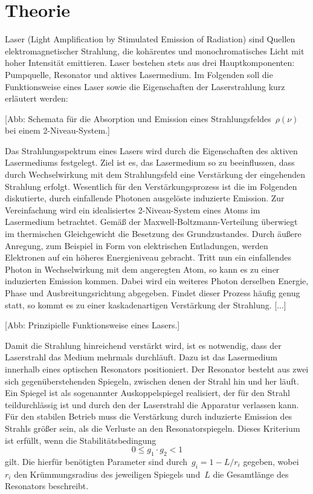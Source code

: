 \section{Theorie}
\label{sec:theorie}

Laser (Light Amplification by Stimulated Emission of Radiation) sind Quellen
elektromagnetischer Strahlung, die kohärentes und monochromatisches Licht mit
hoher Intensität emittieren. Laser bestehen stets aus drei Hauptkomponenten:
Pumpquelle, Resonator und aktives Lasermedium. Im Folgenden soll die
Funktionsweise eines Laser sowie die Eigenschaften der Laserstrahlung kurz
erläutert werden:

[Abb: Schemata für die Absorption und Emission eines
Strahlungsfeldes~$\rho(\nu)$ bei einem \num{2}-Niveau-System.]

Das Strahlungsspektrum eines Lasers wird durch die Eigenschaften des aktiven
Lasermediums festgelegt. Ziel ist es, das Lasermedium so zu beeinflussen, dass
durch Wechselwirkung mit dem Strahlungsfeld eine Verstärkung der eingehenden
Strahlung erfolgt. Wesentlich für den Verstärkungsprozess ist die im Folgenden
diskutierte, durch einfallende Photonen ausgelöste induzierte Emission. Zur
Vereinfachung wird ein idealisiertes 2-Niveau-System eines Atoms im Lasermedium
betrachtet. Gemäß der Maxwell-Boltzmann-Verteilung überwiegt im thermischen
Gleichgewicht die Besetzung des Grundzustandes. Durch äußere Anregung, zum
Beispiel in Form von elektrischen Entladungen, werden Elektronen auf ein höheres
Energieniveau gebracht. Tritt nun ein einfallendes Photon in Wechselwirkung mit
dem angeregten Atom, so kann es zu einer induzierten Emission kommen. Dabei wird
ein weiteres Photon derselben Energie, Phase und Ausbreitungsrichtung abgegeben.
Findet dieser Prozess häufig genug statt, so kommt es zu einer kaskadenartigen
Verstärkung der Strahlung.
[...]

[Abb: Prinzipielle Funktionsweise eines Lasers.]

Damit die Strahlung hinreichend verstärkt wird, ist es notwendig, dass der
Laserstrahl das Medium mehrmals durchläuft. Dazu ist das Lasermedium innerhalb
eines optischen Resonators positioniert. Der Resonator besteht aus zwei sich
gegenüberstehenden Spiegeln, zwischen denen der Strahl hin und her läuft. Ein
Spiegel ist als sogenannter Auskoppelspiegel realisiert, der für den Strahl
teildurchlässig ist und durch den der Laserstrahl die Apparatur verlassen kann.
Für den stabilen Betrieb muss die Verstärkung durch induzierte Emission des
Strahls größer sein, als die Verluste an den Resonatorspiegeln. Dieses Kriterium
ist erfüllt, wenn die Stabilitätsbedingung
%
\begin{equation}
  0\leq g_1\cdot g_2<1
  \label{eq:bedingung}
\end{equation}
%
gilt. Die hierfür benötigten Parameter sind durch~$g_i=1-L/r_i$ gegeben,
wobei~$r_i$ den Krümmungsradius des jeweiligen Spiegels und~$L$ die Gesamtlänge
des Resonators beschreibt.

